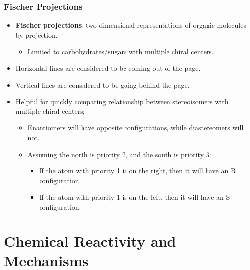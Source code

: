 \documentclass[12pt,a4paper]{article}
\begin{document}
\begin{itemize}
    \subsubsection{Fischer Projections}
    \begin{itemize}
        \item \textbf{Fischer projections}: two-dimensional representations of organic molecules by projection.
            \begin{itemize}
                \item Limited to carbohydrates/sugars with multiple chiral centers.
            \end{itemize}
        \item {\color{o-Sun}Horizontal} lines are considered to be coming {\color{o-Sun}out} of the page.
        \item {\color{o-Sun}Vertical} lines are considered to be going {\color{o-Sun}behind} the page.
        \item Helpful for quickly comparing relationship between stereoisomers with multiple chiral centers;
            \begin{itemize}
                \item Enantiomers will have opposite configurations, while diastereomers will not.
                \item Assuming the north is priority 2, and the south is priority 3:
                    \begin{itemize}
                        \item If the atom with priority 1 is on the {\color{true}right}, then it will have an {\color{true}R} configuration.
                        \item If the atom with priority 1 is on the {\color{false}left}, then it will have an {\color{false}S} configuration.
                    \end{itemize}
            \end{itemize}
    \end{itemize}
\end{itemize}



\clearpage
\section{Chemical Reactivity and Mechanisms}
\end{document}
